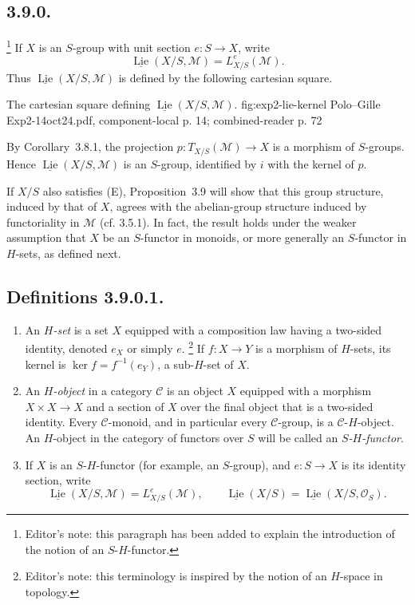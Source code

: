 \subsection*{3.9.0.}
\footnote{Editor's note: this paragraph has been added to explain the
introduction of the notion of an \(S\)-\(H\)-functor.}
If \(X\) is an \(S\)-group with unit section \(e:S\to X\), write
\[
  \underline{\operatorname{Lie}}(X/S,\mathcal M)
  =L^e_{X/S}(\mathcal M).
\]
Thus \(\underline{\operatorname{Lie}}(X/S,\mathcal M)\) is defined by the
following cartesian square.

  {The cartesian square defining \(\underline{\operatorname{Lie}}(X/S,\mathcal M)\).}
  {fig:exp2-lie-kernel}
  {Polo--Gille Exp2-14oct24.pdf, component-local p. 14; combined-reader p. 72}

By Corollary~3.8.1, the projection
\(p:T_{X/S}(\mathcal M)\to X\) is a morphism of \(S\)-groups. Hence
\(\underline{\operatorname{Lie}}(X/S,\mathcal M)\) is an \(S\)-group,
identified by \(i\) with the kernel of \(p\).

If \(X/S\) also satisfies (E), Proposition~3.9 will show that this group
structure, induced by that of \(X\), agrees with the abelian-group
structure induced by functoriality in \(\mathcal M\) (cf. 3.5.1). In fact,
the result holds under the weaker assumption that \(X\) be an
\(S\)-functor in monoids, or more generally an \(S\)-functor in
\(H\)-sets, as defined next.

\subsection*{Definitions 3.9.0.1.}
\begin{enumerate}
\item[(a)] An \emph{\(H\)-set} is a set \(X\) equipped with a composition
law having a two-sided identity, denoted \(e_X\) or simply \(e\).
\footnote{Editor's note: this terminology is inspired by the notion of an
\(H\)-space in topology.}
If \(f:X\to Y\) is a morphism of \(H\)-sets, its kernel is
\(\ker f=f^{-1}(e_Y)\), a sub-\(H\)-set of \(X\).

\item[(b)] An \emph{\(H\)-object} in a category \(\mathscr C\) is an
object \(X\) equipped with a morphism \(X\times X\to X\) and a section
of \(X\) over the final object that is a two-sided identity. Every
\(\mathscr C\)-monoid, and in particular every \(\mathscr C\)-group, is
a \(\mathscr C\)-\(H\)-object. An \(H\)-object in the category of functors
over \(S\) will be called an \emph{\(S\)-\(H\)-functor}.

\item[(c)] If \(X\) is an \(S\)-\(H\)-functor (for example, an
\(S\)-group), and \(e:S\to X\) is its identity section, write
\[
  \underline{\operatorname{Lie}}(X/S,\mathcal M)=L^e_{X/S}(\mathcal M),
  \qquad
  \underline{\operatorname{Lie}}(X/S)
  =\underline{\operatorname{Lie}}(X/S,\mathcal O_S).
\]
\end{enumerate}

